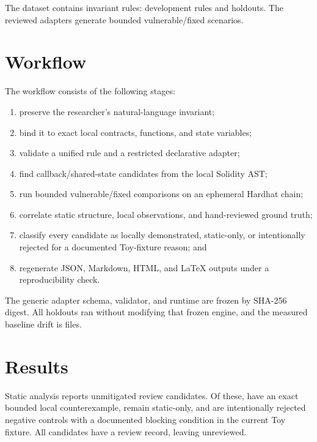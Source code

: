 \documentclass[11pt]{article}
\begin{document}
The dataset contains \RuleCount{} invariant rules: \DevelopmentRuleCount{} development rules and \HoldoutRuleCount{} holdouts. The reviewed adapters generate \ScenarioCount{} bounded vulnerable/fixed scenarios.

\section{Workflow}

The workflow consists of the following stages:

\begin{enumerate}
  \item preserve the researcher's natural-language invariant;
  \item bind it to exact local contracts, functions, and state variables;
  \item validate a unified rule and a restricted declarative adapter;
  \item find callback/shared-state candidates from the local Solidity AST;
  \item run bounded vulnerable/fixed comparisons on an ephemeral Hardhat chain;
  \item correlate static structure, local observations, and hand-reviewed ground truth;
  \item classify every candidate as locally demonstrated, static-only, or intentionally rejected for a documented Toy-fixture reason; and
  \item regenerate JSON, Markdown, HTML, and LaTeX outputs under a reproducibility check.
\end{enumerate}

The generic adapter schema, validator, and runtime are frozen by SHA-256 digest. All \HoldoutsWithoutChangeCount{} holdouts ran without modifying that frozen engine, and the measured baseline drift is \BaselineDriftCount{} files.

\section{Results}

Static analysis reports \StaticCandidateCount{} unmitigated review candidates. Of these, \DemonstratedCandidateCount{} have an exact bounded local counterexample, \StaticOnlyCandidateCount{} remain static-only, and \RejectedCandidateCount{} are intentionally rejected negative controls with a documented blocking condition in the current Toy fixture. All \ReviewedCandidateCount{} candidates have a review record, leaving \UnreviewedCandidateCount{} unreviewed.
\end{document}
